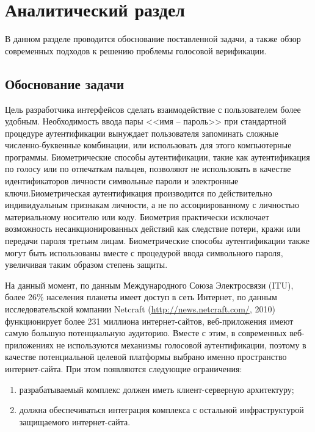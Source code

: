 \chapter{Аналитический раздел}

В данном разделе проводится обоснование поставленной задачи, а также обзор современных подходов к решению проблемы голосовой верификации.

\section{Обоснование задачи}

Цель разработчика интерфейсов сделать взаимодействие с пользователем более удобным. Необходимость ввода пары <<имя -- пароль>> при стандартной процедуре аутентификации вынуждает пользователя запоминать сложные численно-буквенные комбинации, или использовать для этого компьютерные программы. Биометрические способы аутентификации, такие как аутентификация по голосу или по отпечаткам пальцев, позволяют не использовать в качестве идентификаторов личности символьные пароли и электронные ключи.Биометрическая аутентификация производится по действительно индивидуальным признакам личности, а не по ассоциированному с личностью материальному носителю или коду. Биометрия практически исключает возможность несанкционированных действий как следствие потери, кражи или передачи пароля третьим лицам. 
Биометрические способы аутентификации также могут быть использованы вместе с процедурой ввода символьного пароля, увеличивая таким образом степень защиты.

На данный момент, по данным Международного Союза Электросвязи (ITU), более 26\% населения планеты имеет доступ в сеть Интернет, по данным исследовательской компании Netcraft (\url{http://news.netcraft.com/}, 2010) функционирует более 231 миллиона интернет-сайтов, веб-приложения имеют самую большую потенциальную аудиторию. Вместе с этим, в современных веб-приложениях не используются механизмы голосовой аутентификации, поэтому в качестве потенциальной целевой платформы выбрано именно пространство интернет-сайта. При этом появляются следующие ограничения:

\begin{enumerate}
\item разрабатываемый комплекс должен иметь клиент-серверную архитектуру;
\item должна обеспечиваться интеграция комплекса с остальной инфраструктурой защищаемого интернет-сайта.
\end{enumerate}

